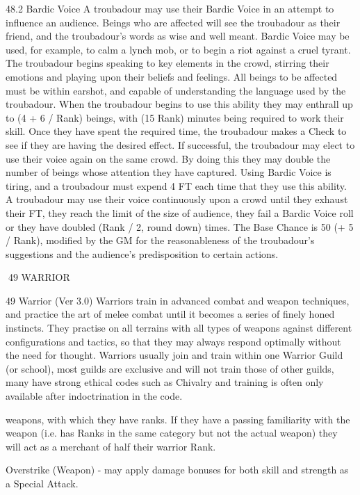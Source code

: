 \documentclass[a4paper]{article}
\begin{document}
\begin{multicols}{3}
48.2 Bardic Voice
A troubadour may use their Bardic Voice in an
attempt to influence an audience. Beings who are
affected will see the troubadour as their friend, and
the troubadour’s words as wise and well meant.
Bardic Voice may be used, for example, to calm a
lynch mob, or to begin a riot against a cruel tyrant.
The troubadour begins speaking to key elements in
the crowd, stirring their emotions and playing upon
their beliefs and feelings. All beings to be affected
must be within earshot, and capable of understanding the language used by the troubadour. When the
troubadour begins to use this ability they may
enthrall up to (4 + 6 / Rank) beings, with (15 Rank) minutes being required to work their skill.
Once they have spent the required time, the troubadour makes a Check to see if they are having the
desired effect. If successful, the troubadour may
elect to use their voice again on the same crowd.
By doing this they may double the number of beings whose attention they have captured.
Using Bardic Voice is tiring, and a troubadour
must expend 4 FT each time that they use this
ability. A troubadour may use their voice continuously upon a crowd until they exhaust their FT,
they reach the limit of the size of audience, they
fail a Bardic Voice roll or they have doubled (Rank
/ 2, round down) times. The Base Chance is 50%
(+ 5 / Rank), modified by the GM for the reasonableness of the troubadour’s suggestions and the
audience’s predisposition to certain actions.

49 WARRIOR

49 Warrior (Ver 3.0)
Warriors train in advanced combat and weapon
techniques, and practice the art of melee combat
until it becomes a series of finely honed instincts.
They practise on all terrains with all types of
weapons against different configurations and tactics, so that they may always respond optimally
without the need for thought.
Warriors usually join and train within one Warrior
Guild (or school), most guilds are exclusive and
will not train those of other guilds, many have
strong ethical codes such as Chivalry and training
is often only available after indoctrination in the
code.

weapons, with which they have ranks. If they
have a passing familiarity with the weapon
(i.e. has Ranks in the same category but not
the actual weapon) they will act as a merchant of half their warrior Rank.

Overstrike (Weapon) - may apply damage bonuses for both skill and strength as a Special Attack.


\end{multicols}
\end{document}
